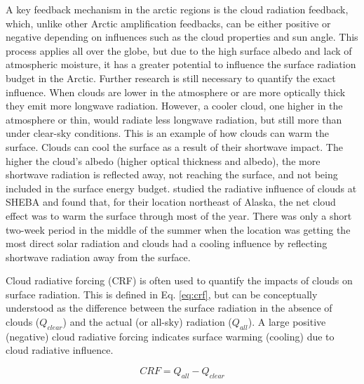 A key feedback mechanism in the arctic regions is the cloud radiation feedback, which, unlike other Arctic amplification feedbacks, can be either positive or negative depending on influences such as the cloud properties and sun angle. This process applies all over the globe, but due to the high surface albedo and lack of atmospheric moisture, it has a greater potential to influence the surface radiation budget in the Arctic. Further research is still necessary to quantify the exact influence. When clouds are lower in the atmosphere or are more optically thick they emit more longwave radiation. However, a cooler cloud, one higher in the atmosphere or thin, would radiate less longwave radiation, but still more than under clear-sky conditions. This is an example of how clouds can warm the surface. Clouds can cool the surface as a result of their shortwave impact. The higher the cloud's albedo (higher optical thickness and albedo), the more shortwave radiation is reflected away, not reaching the surface, and not being included in the surface energy budget. \citet{intrieri:2002} studied the radiative influence of clouds at SHEBA and found that, for their location northeast of Alaska, the net cloud effect was to warm the surface through most of the year. There was only a short two-week period in the middle of the summer when the location was getting the most direct solar radiation and clouds had a cooling influence by reflecting shortwave radiation away from the surface. 

Cloud radiative forcing (CRF) is often used to quantify the impacts of clouds on surface radiation. This is defined in Eq. \ref{eq:crf}, but can be conceptually understood as the difference between the surface radiation in the absence of clouds ($Q_{clear}$) and the actual (or all-sky) radiation ($Q_{all}$). A large positive (negative) cloud radiative forcing indicates surface warming (cooling) due to cloud radiative influence. 

\begin{equation}\label{eq:crf}
CRF = Q_{all} - Q_{clear}
\end{equation}

